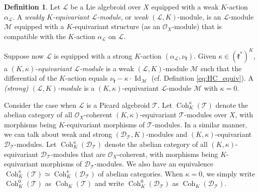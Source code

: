 \documentclass[12pt]{amsart}
\newcommand{\M}{\mathcal{M}}
\newcommand{\kf}{\mathfrak{k}}
\newcommand{\Id}{\operatorname{Id}}
\newcommand{\TT}{\mathscr{T}}
\newcommand{\LL}{\mathcal{L}}
\newcommand{\OO}{\mathcal{O}}
\newcommand{\coh}{\operatorname{Coh}}
\theoremstyle{definition}
\newtheorem{defi}[Thm]{Definition}
\numberwithin{equation}{section}
\begin{document}
\begin{defi}\label{defn:pic_module_action}
	Let $\LL$ be a Lie algebroid over $X$ equipped with a weak $K$-action $\alpha_\LL$. A {\it weakly $K$-equivariant $\LL$-module}, or {\it weak $(\LL, K)$}-module, is an $\LL$-module $\M$ equipped with a $K$-equivariant structure (as an $\OO_X$-module) that is compatible with the $K$-action $\alpha_\LL$ on $\LL$. 	
	
	Suppose now $\LL$ is equipped with a strong $K$-action $(\alpha_\LL, \nu_\kf)$. Given $\kappa \in (\kf^*)^{K}$, a {\it $(K, \kappa)$-equivariant $\LL$-module} is a weak $(\LL, K)$-module $\M$ such that the differential of the $K$-action equals $\nu_\kf - \kappa \cdot \Id_\M$ (cf. Definition \ref{eq:HC_equiv}). A {\it (strong) $(\LL, K)$-module} is a $(K,\kappa)$-equivariant $\LL$-module $\M$ with $\kappa=0$.
\end{defi}

Consider the case when $\LL$ is a Picard algebroid $\TT$. Let $\coh_K^\kappa(\TT)$ denote the abelian category of all $\OO_X$-coherent $(K,\kappa)$-equivariant $\TT$-modules over $X$, with morphisms being $K$-equivariant morphisms of $\TT$-modules.  In a similar manner, we can talk about weak and strong $(\mathscr{D}_\TT, K)$-modules and $(K, \kappa)$-equivariant $\mathscr{D}_\TT$-modules. Let $\coh_K^\kappa(\mathscr{D}_\TT)$ denote the abelian category of all $(K,\kappa)$-equivariant $\mathscr{D}_\TT$-modules that are $\OO_X$-coherent, with morphisms being $K$-equivariant morphisms of $\mathscr{D}_\TT$-modules. We also have an equivalence $\coh_K^\kappa(\TT) \simeq \coh_K^\kappa(\mathscr{D}_\TT)$ of abelian categories. When $\kappa=0$, we simply write $\coh_K^0(\TT)$ as $\coh_K(\TT)$ and write $\coh_K^{0}(\mathscr{D}_\TT)$ as $\coh_K(\mathscr{D}_\TT) $.
\end{document}
